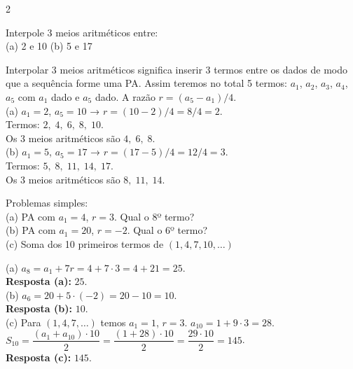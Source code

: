 \documentclass[11pt]{article}
\begin{document}
\begin{multicols}{2}
\begin{tcolorbox}[colback=blue!8,colframe=blue!60!black, title=\textbf{Questão 6 }, text width=0.9\columnwidth]
Interpole 3 meios aritméticos entre: \\
(a) 2 e 10 \quad (b) 5 e 17
\end{tcolorbox}

\begin{tcolorbox}[colback=green!10,colframe=green!60!black, title=\textbf{Solução da questão 6 }, text width=0.9\columnwidth]
Interpolar 3 meios aritméticos significa inserir 3 termos entre os dados de modo que a sequência forme uma PA. Assim teremos no total 5 termos: $a_1$, $a_2$, $a_3$, $a_4$, $a_5$ com $a_1$ dado e $a_5$ dado. A razão $r=(a_5-a_1)/4$. \\

(a) $a_1=2$, $a_5=10$ → $r=(10-2)/4 = 8/4 = 2$. \\
Termos: $2,\; 4,\; 6,\; 8,\; 10$. \\
Os 3 meios aritméticos são \(\boxed{4,\;6,\;8}\). \\

(b) $a_1=5$, $a_5=17$ → $r=(17-5)/4 = 12/4 = 3$. \\
Termos: $5,\;8,\;11,\;14,\;17$. \\
Os 3 meios aritméticos são \(\boxed{8,\;11,\;14}\).
\end{tcolorbox}

\begin{tcolorbox}[colback=blue!8,colframe=blue!60!black, title=\textbf{Questão 7 }, text width=0.9\columnwidth]
Problemas simples: \\
(a) PA com $a_1=4$, $r=3$. Qual o 8º termo? \\
(b) PA com $a_1=20$, $r=-2$. Qual o 6º termo? \\
(c) Soma dos 10 primeiros termos de $(1,4,7,10,\ldots)$
\end{tcolorbox}

\begin{tcolorbox}[colback=green!10,colframe=green!60!black, title=\textbf{Solução da questão 7 }, text width=0.9\columnwidth]
(a) $a_8 = a_1 + 7r = 4 + 7\cdot3 = 4 +21 = 25$. \\
\textbf{Resposta (a):} $25$. \\

(b) $a_6 = 20 + 5\cdot(-2) = 20 -10 = 10$. \\
\textbf{Resposta (b):} $10$. \\
 
(c) Para $(1,4,7,\ldots)$ temos $a_1=1$, $r=3$. $a_{10} = 1 + 9\cdot3 = 28$. \\
$S_{10} = \dfrac{(a_1 + a_{10})\cdot 10}{2} = \dfrac{(1+28)\cdot10}{2} = \dfrac{29\cdot10}{2} = 145$. \\
\textbf{Resposta (c):} $145$.
\end{tcolorbox}


\end{multicols}
\end{document}
